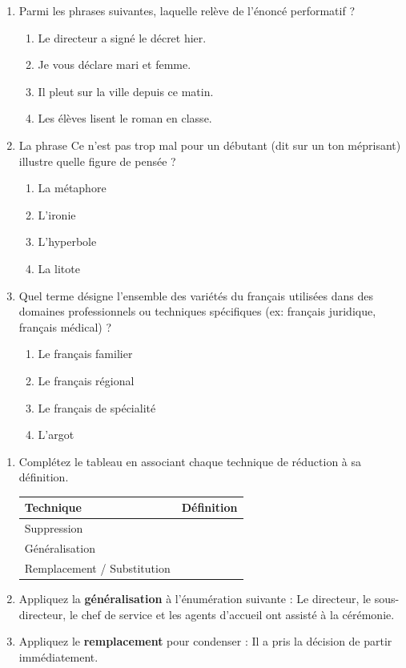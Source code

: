\documentclass[11pt]{article}
\begin{document}
\begin{exercice}
\begin{enumerate}
    \item Parmi les phrases suivantes, laquelle relève de l'énoncé performatif ?
    \begin{enumerate}
        \item Le directeur a signé le décret hier.
        \item Je vous déclare mari et femme.
        \item Il pleut sur la ville depuis ce matin.
        \item Les élèves lisent le roman en classe.
    \end{enumerate}
    \item La phrase \og Ce n'est pas trop mal pour un débutant \fg{} (dit sur un ton méprisant) illustre quelle figure de pensée ?
    \begin{enumerate}
        \item La métaphore \item L'ironie \item L'hyperbole \item La litote
    \end{enumerate}
    \item Quel terme désigne l'ensemble des variétés du français utilisées dans des domaines professionnels ou techniques spécifiques (ex: français juridique, français médical) ?
    \begin{enumerate}
        \item Le français familier \item Le français régional \item Le français de spécialité \item L'argot
    \end{enumerate}
\end{enumerate}
\end{exercice}

\begin{exercice}
\begin{enumerate}
    \item Complétez le tableau en associant chaque technique de réduction à sa définition.
    \begin{tabular}{|p{3.5cm}|p{11cm}|}
    \hline
    \textbf{Technique} & \textbf{Définition} \\ \hline
    Suppression & \\ \hline
    Généralisation & \\ \hline
    Remplacement / Substitution & \\ \hline
    \end{tabular}
    \item Appliquez la \textbf{généralisation} à l'énumération suivante : \og Le directeur, le sous-directeur, le chef de service et les agents d'accueil ont assisté à la cérémonie. \fg
    \item Appliquez le \textbf{remplacement} pour condenser : \og Il a pris la décision de partir immédiatement. \fg
\end{enumerate}
\end{exercice}
\end{document}
